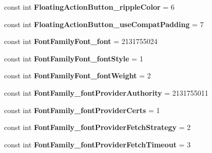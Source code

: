 \begin{DoxyCompactItemize}
const int {\bfseries Floating\+Action\+Button\+\_\+ripple\+Color} = 6
\item 
\mbox{\label{classst_delivery_1_1_resource_1_1_styleable_afab590f88045b7cf661c1dd3b89983d6}} 
const int {\bfseries Floating\+Action\+Button\+\_\+use\+Compat\+Padding} = 7
\item 
\mbox{\label{classst_delivery_1_1_resource_1_1_styleable_a3dba1128de28d452b9fc1ab2c799bb62}} 
const int {\bfseries Font\+Family\+Font\+\_\+font} = 2131755024
\item 
\mbox{\label{classst_delivery_1_1_resource_1_1_styleable_a0f70369951ecd1719f6b4b82909b091f}} 
const int {\bfseries Font\+Family\+Font\+\_\+font\+Style} = 1
\item 
\mbox{\label{classst_delivery_1_1_resource_1_1_styleable_a72780401378e3cebafb5449082ce88e0}} 
const int {\bfseries Font\+Family\+Font\+\_\+font\+Weight} = 2
\item 
\mbox{\label{classst_delivery_1_1_resource_1_1_styleable_a6d118c6f27b0aa2f91019698d6be6e73}} 
const int {\bfseries Font\+Family\+\_\+font\+Provider\+Authority} = 2131755011
\item 
\mbox{\label{classst_delivery_1_1_resource_1_1_styleable_abf864b28e0c85a6c3b98de044fc73640}} 
const int {\bfseries Font\+Family\+\_\+font\+Provider\+Certs} = 1
\item 
\mbox{\label{classst_delivery_1_1_resource_1_1_styleable_af4212a1d7ba6c7e9e729eab29a014b33}} 
const int {\bfseries Font\+Family\+\_\+font\+Provider\+Fetch\+Strategy} = 2
\item 
\mbox{\label{classst_delivery_1_1_resource_1_1_styleable_a1ed690d1249494240125888f92de14c8}} 
const int {\bfseries Font\+Family\+\_\+font\+Provider\+Fetch\+Timeout} = 3
\item 
\mbox{\label{classst_delivery_1_1_resource_1_1_styleable_ae89945f5fd54de26f0551904939bafdb}} 

\end{DoxyCompactItemize}
